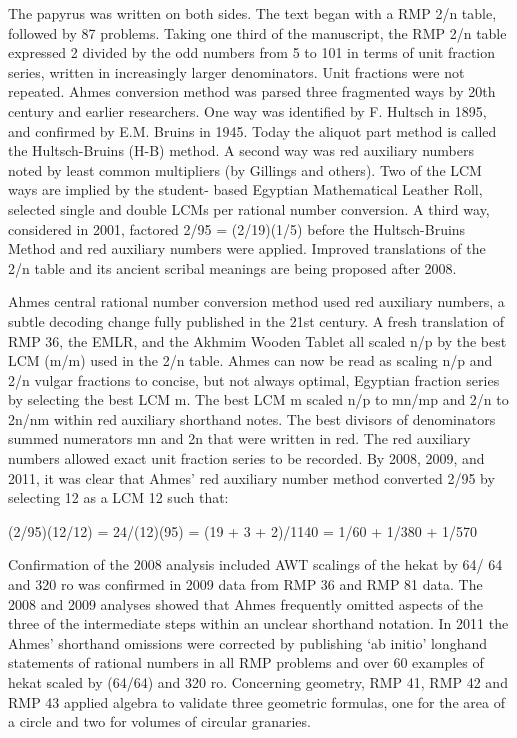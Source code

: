 \documentclass[12pt]{article}
\begin{document}
The papyrus was written on both sides. The text began with a RMP 2/n table, followed by 87 problems. Taking one third of the manuscript, the RMP 2/n table expressed 2 divided by the odd numbers from 5 to 101 in terms of unit fraction series, written in increasingly larger denominators. Unit fractions were not repeated. Ahmes conversion method was parsed three fragmented ways by 20th century and earlier researchers. One way was identified by F. Hultsch in 1895, and confirmed by E.M. Bruins in 1945. Today the aliquot part method is called the Hultsch-Bruins (H-B) method. A second way was red auxiliary numbers noted by least common multipliers (by Gillings and others). Two of the LCM ways are implied by the student- based Egyptian Mathematical Leather Roll, selected single and double LCMs per rational number conversion. A third way, considered in 2001, factored 2/95 = (2/19)(1/5) before the Hultsch-Bruins Method and red auxiliary numbers were applied. Improved translations of the 2/n table and its ancient scribal meanings are being proposed after 2008.

Ahmes central rational number conversion method used red auxiliary numbers, a subtle decoding change fully published in the 21st century. A fresh translation of RMP 36, the EMLR, and the Akhmim Wooden Tablet all scaled n/p by the best LCM (m/m) used in the 2/n table. 
Ahmes can now be read as scaling n/p and 2/n vulgar fractions to concise, but not always optimal, Egyptian fraction series by selecting the best LCM m. The best LCM m scaled n/p to mn/mp and 2/n to 2n/nm within red auxiliary shorthand notes. The best divisors of denominators summed numerators mn and 2n that were written in red. The red auxiliary numbers allowed exact unit fraction series to be recorded. By 2008, 2009, and 2011, it was clear that Ahmes’ red auxiliary number method converted 2/95 by selecting 12 as a LCM 12 such that:

(2/95)(12/12) = 24/(12)(95) = (19 + 3 + 2)/1140 = 1/60 + 1/380 + 1/570

Confirmation of the 2008 analysis included AWT scalings of the hekat by 64/ 64 and 320 ro was confirmed in 2009 data from RMP 36 and RMP 81 data. The 2008 and 2009 analyses showed that Ahmes frequently omitted aspects of the three of the intermediate steps within an unclear shorthand notation. In 2011 the Ahmes’ shorthand omissions were corrected by publishing ‘ab initio’ longhand statements of rational numbers in all RMP problems and over 60 examples of hekat scaled by (64/64) and 320 ro. 
Concerning geometry, RMP 41, RMP 42 and RMP 43 applied algebra to validate three geometric formulas, one for the area of a circle and two for volumes of circular granaries.
\end{document}
